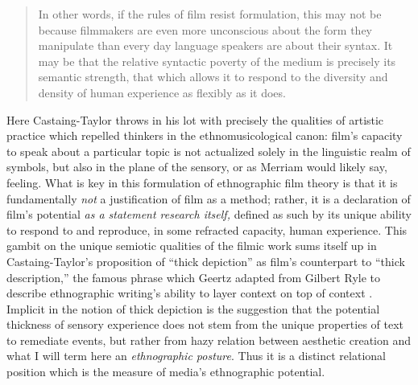 \begin{quote}
In other words, if the rules of film resist formulation, this may not be
because filmmakers are even more unconscious about the form they
manipulate than every day language speakers are about their syntax. It
may be that the relative syntactic poverty of the medium is precisely
its semantic strength, that which allows it to respond to the diversity
and density of human experience as flexibly as it does.
\autocite*[86-87]{taylor_iconophobia:_1996}
\end{quote}

\noindent Here Castaing-Taylor throws in his lot with precisely the
qualities of artistic practice which repelled thinkers in the
ethnomusicological canon: film's capacity to speak about a particular
topic is not actualized solely in the linguistic realm of symbols, but
also in the plane of the sensory, or as Merriam would likely say,
feeling. What is key in this formulation of ethnographic film theory is
that it is fundamentally \emph{not} a justification of film as a method;
rather, it is a declaration of film's potential \emph{as a statement
research itself,} defined as such by its unique ability to respond to
and reproduce, in some refracted capacity, human experience. This gambit
on the unique semiotic qualities of the filmic work sums itself up in
Castaing-Taylor's proposition of ``thick depiction'' as film's
counterpart to ``thick description,'' the famous phrase which Geertz
adapted from Gilbert Ryle to describe ethnographic writing's ability to
layer context on top of context \autocite[6]{geertz_thick_1973}.
Implicit in the notion of thick depiction is the suggestion that the
potential thickness of sensory experience does not stem from the unique
properties of text to remediate events, but rather from hazy relation
between aesthetic creation and what I will term here an
\emph{ethnographic posture}. Thus it is a distinct relational position
which is the measure of media's ethnographic potential.
